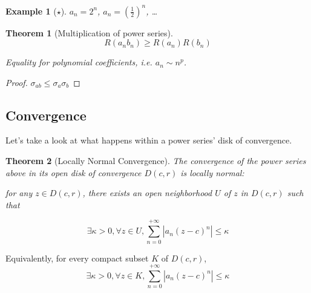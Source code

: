 \documentclass{article}
\newtheorem*{example}{Example}
\newtheorem*{thm*}{Theorem}
\begin{document}
\begin{example}
    [$\star$]
    $a_n = 2^n$, $a_n = \left(\frac{1}{2}\right)^n$, \dots
\end{example}

\begin{thm*}
    [Multiplication of power series]
    $$R(a_nb_n) \geq R(a_n)R(b_n)$$

    Equality for polynomial coefficients, i.e. $a_n \sim n^p$.
\end{thm*}
\begin{proof}
    $\sigma_{ab} \leq \sigma_a\sigma_b$
\end{proof}

\subsection{Convergence}
Let's take a look at what happens within a power series' disk of convergence.

\begin{thm*}
    [Locally Normal Convergence]
    The convergence of the power series above in its open disk of convergence $D(c, r)$ is locally normal:
    
    for any $z\in D(c,r)$, there exists an open neighborhood $U$ of $z$ in $D(c, r)$ such that

    $$\exists \kappa > 0, \forall z \in U, \sum_{n=0}^{+\infty}|a_n(z-c)^n| \leq \kappa$$
\end{thm*}


    Equivalently, for every compact subset $K$ of $D(c,r)$,
    $$\exists \kappa > 0, \forall z \in K, \sum_{n=0}^{+\infty}|a_n(z-c)^n| \leq \kappa$$
\end{document}
